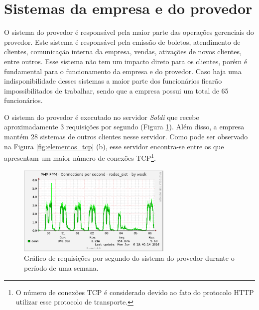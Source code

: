 \section{Sistemas da empresa e do provedor}
\label{section:sistemas}

O sistema do provedor é responsável pela maior parte das operações gerenciais do provedor. Este sistema é responsável pela emissão de 
boletos, atendimento de clientes, comunicação interna da empresa, vendas, ativações de novos clientes, entre outros. Esse sistema não tem um 
impacto direto para os clientes, porém é fundamental para o funcionamento da empresa e do provedor. Caso haja uma indisponibilidade desses sistemas 
a maior parte dos funcionários ficarão impossibilitados de trabalhar, sendo que a empresa possui um total de 65 funcionários.

O sistema do provedor é executado no servidor \textit{Soldi} que recebe aproximadamente 3 requisições  por segundo
(Figura \ref{fig:soldi_week}). Além disso, a empresa mantém 28 sistemas de outros clientes nesse servidor. 
Como pode ser observado na Figura \ref{fig:elementos_tcp} (b), esse servidor encontra-se entre os que apresentam um maior número de conexões 
\ac{TCP}\footnote[1]{O número de conexões \ac{TCP} é considerado devido ao fato do protocolo \ac{HTTP} utilizar esse 
protocolo de transporte.}.


\begin{figure}[h!]
 \centering
 \includegraphics[width=280px]{img/soldi_week.eps}
 \caption{Gráfico de requisições por segundo do sistema do provedor durante o período de uma semana.}
 \label{fig:soldi_week}
\end{figure}

